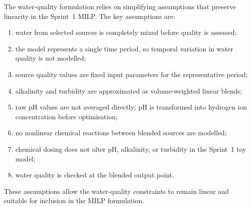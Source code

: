 \documentclass[10pt]{article}
\begin{document}
The water-quality formulation relies on simplifying assumptions that preserve
linearity in the Sprint~1 MILP. The key assumptions are:
\begin{enumerate}[label=(\roman*)]
    \item water from selected sources is completely mixed before quality is assessed;
    \item the model represents a single time period, so temporal variation in water quality is not modelled;
    \item source quality values are fixed input parameters for the representative period;
    \item alkalinity and turbidity are approximated as volume-weighted linear blends;
    \item raw pH values are not averaged directly; pH is transformed into hydrogen ion concentration before optimisation;
    \item no nonlinear chemical reactions between blended sources are modelled;
    \item chemical dosing does not alter pH, alkalinity, or turbidity in the Sprint~1 toy model;
    \item water quality is checked at the blended output point.
\end{enumerate}

These assumptions allow the water-quality constraints to remain linear and
suitable for inclusion in the MILP formulation.
\end{document}
